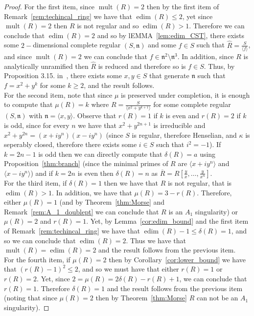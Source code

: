\documentclass{article}
\DeclareMathOperator{\edim}{edim}
\DeclareMathOperator{\mult}{mult}
\numberwithin{theorem}{section}
\begin{document}
\begin{proof}
    For the first item, since $\mult(R)=2$ then by the first item of Remark~\ref{rem:techincal_ring} we have that $\edim(R) \leq 2$, yet since $\mult(R)=2$ then $R$ is not regular and so $\edim(R)>1$. Therefore we can conclude that $\edim(R)=2$ and so by lEMMA~\ref{lem:edim_CST}, there exists some $2-$dimensional complete regular $(S, \mathfrak{n})$ and some $f \in S$ such that $\hat{R}=\frac{S}{\langle f \rangle}$, and since $\mult(R)=2$ we can conclude that $f \in \mathfrak{n}^2 \setminus \mathfrak{n}^3$. In addition, since $R$ is analytically unramified then $\hat{R}$ is reduced and therefore so is $f \in S$. Thus, by Proposition 3.15. in~\cite{svoray2025ade}, there exists some $x,y \in S$ that generate $\mathfrak{n}$ such that $f=x^2 + y^k$ for some $k \geq 2$, and the result follows.\\

     For the second item, note that since $\mu$ is preserved under completion, it is enough to compute that $\mu\left(R\right)=k$ where $R=\frac{S}{\langle x^2 + y^{k+1}\rangle}$ for some complete regular $(S, \mathfrak{n})$ with $\mathfrak{n}= \langle x,y \rangle$. Observe that $r(R)=1$ if $k$ is even and $r(R)=2$ if $k$ is odd, since for every $n$ we have that $x^2+y^{2n+1}$ is irreducible and $x^2+ y^{2n} = (x+iy^n)(x-iy^n)$ (since $S$ is regular, therefore Henselian, and $\kappa$ is seperably closed, therefore there exists some $i\in S$ such that $i^2=-1$). If $k=2n-1$ is odd then we can directly compute that $\delta(R)=a$ using Proposition~\ref{thm:branch} (since the minimal primes of $R$ are $\langle x+iy^{n}\rangle$ and $\langle x-iy^{n}\rangle$) and if $k=2n$ is even then $\delta(R)=n$ as $\overline{R} = R\left[\frac{y}{x}, \dots, \frac{y}{x^n}\right]$.\\
    
    For the third item, if $\delta(R)=1$ then we have that $R$ is not regular, that is $\edim(R)>1$. In addition, we have that $\mu(R)=3-r(R)$. Therefore, either $\mu(R)=1$ (and by Theorem~\ref{thm:Morse} and Remark~\ref{rem:A_1_doublept} we can conclude that $R$ is an $A_1$ singularity) or $\mu(R)=2$ and $r(R)=1$.  Yet, by Lemma~\ref{cor:edim_bound} and the first item of Remark~\ref{rem:techincal_ring} we have that $\edim(R)-1 \leq \delta(R)=1$, and so we can conclude that $\edim(R)=2$. Thus we have that $\mult(R)=\edim(R)=2$ and the result follows from the previous item.\\

    For the fourth item, if $\mu(R)=2$ then by Corollary~\ref{cor:lower_bound} we have that $(r(R)-1)^2 \leq 2$, and so we must have that either $r(R)=1$ or $r(R)=2$. Yet, since $2=\mu(R)=2\delta(R)-r(R)+1$, we can conclude that $r(R)=1$. Therefore $\delta(R)=1$ and the result follows from the previous item (noting that since $\mu(R)=2$ then by Theorem~\ref{thm:Morse}  $R$ can not be an $A_1$ singularity). 
\end{proof}
\end{document}
